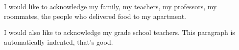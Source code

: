 I would like to acknowledge my family, my teachers, my professors, my roommates, the people who delivered food to my apartment.

I would also like to acknowledge my grade school teachers.
This paragraph is automatically indented, that's good.


